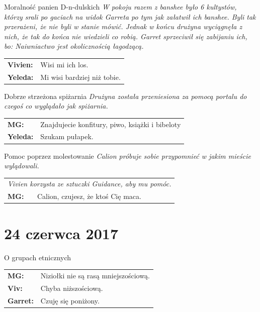 \documentclass[10pt,twoside,twocolumn]{book}
\begin{document}
\begin{rpg-quotebox}{Moralność panien D-n-dulskich}
   \textit{W pokoju razem z banshee było 6 kultystów, którzy srali po gaciach na widok Garreta po tym jak załatwił ich banshee. Byli tak przerażeni, że nie byli w stanie mówić. Jednak w końcu drużyna wyciągnęła z nich, że tak do końca nie wiedzieli co robią. Garret sprzeciwił się zabijaniu ich, bo: Naiwniactwo jest okolicznością łagodzącą.}\\
   
   \begin{tabularx}{\columnwidth}{lX}
      \textbf{Vivien:} & Wisi mi ich los.\\
      \textbf{Yeleda:} & Mi wisi bardziej niż tobie.
   \end{tabularx}
\end{rpg-quotebox}


\begin{rpg-quotebox}{Dobrze strzeżona spiżarnia}
   \textit{Drużyna została przeniesiona za pomocą portalu do czegoś co wyglądało jak spiżarnia.}\\
   
   \begin{tabularx}{\columnwidth}{lX}
      \textbf{MG:} & Znajdujecie konfitury, piwo, książki i bibeloty\\
      \textbf{Yeleda:} & Szukam pułapek.
   \end{tabularx}
\end{rpg-quotebox}


\begin{rpg-quotebox}{Pomoc poprzez molestowanie}
   \textit{Calion próbuje sobie przypomnieć w jakim mieście wylądowali.}\\
   
   \begin{tabularx}{\columnwidth}{lX}
      \multicolumn{2}{l}{\textit{Vivien korzysta ze sztuczki Guidance, aby mu pomóc.}}\\
      
      \textbf{MG:} & Calion, czujesz, że ktoś Cię maca.\\
   \end{tabularx}
\end{rpg-quotebox}

\section*{24 czerwca 2017}

\begin{rpg-quotebox}{O grupach etnicznych}
   \begin{tabularx}{\columnwidth}{lX}
      \textbf{MG:} & Niziołki nie są rasą mniejszościową.\\
      \textbf{Viv:} & Chyba niższościową.\\
      \textbf{Garret:} & Czuję się poniżony.
   \end{tabularx}
\end{rpg-quotebox}
\end{document}
